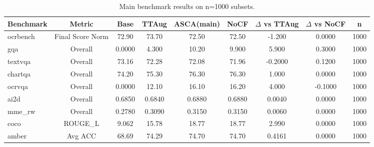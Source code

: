 \begin{table}[t]
\centering
\begin{tabular}{lcccccccc}
\toprule
Benchmark & Metric & Base & TTAug & ASCA(main) & NoCF & $\Delta$ vs TTAug & $\Delta$ vs NoCF & n \\
\midrule
ocrbench & Final Score Norm & 72.90 & 73.70 & 72.50 & 72.50 & -1.200 & 0.0000 & 1000 \\
gqa & Overall & 0.0000 & 4.300 & 10.20 & 9.900 & 5.900 & 0.3000 & 1000 \\
textvqa & Overall & 73.16 & 72.28 & 72.08 & 71.96 & -0.2000 & 0.1200 & 1000 \\
chartqa & Overall & 74.20 & 75.30 & 76.30 & 76.30 & 1.000 & 0.0000 & 1000 \\
ocrvqa & Overall & 0.0000 & 12.10 & 16.10 & 16.20 & 4.000 & -0.1000 & 1000 \\
ai2d & Overall & 0.6850 & 0.6840 & 0.6880 & 0.6880 & 0.0040 & 0.0000 & 1000 \\
mme_rw & Overall & 0.2780 & 0.3090 & 0.3150 & 0.3150 & 0.0060 & 0.0000 & 1000 \\
coco & ROUGE_L & 9.062 & 15.78 & 18.77 & 18.77 & 2.990 & 0.0000 & 1000 \\
amber & Avg ACC & 68.69 & 74.29 & 74.70 & 74.70 & 0.4161 & 0.0000 & 1000 \\
\bottomrule
\end{tabular}
\caption{Main benchmark results on n=1000 subsets.}
\label{tab:main_n1000}
\end{table}
